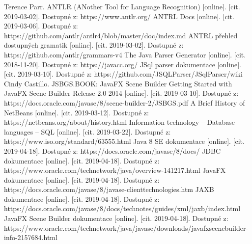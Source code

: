 \documentclass[czech,bachelor,public,dept460,male,cpdeclaration,twoside]{diploma}
\begin{document}
\begin{thebibliography}{99}
	 Terence Parr. ANTLR (ANother Tool for Language Recognition) [online]. [cit. 2019-03-02]. Dostupné z: https://www.antlr.org/
	 ANTRL Docs [online]. [cit. 2019-03-06]. Dostupné z: https://github.com/antlr/antlr4/blob/master/doc/index.md
	 ANTRL přehled dostupných gramatik [online]. [cit. 2019-03-02]. Dostupné z: https://github.com/antlr/grammars-v4
	 The Java Parser Generator [online]. [cit. 2018-11-20]. Dostupné z: https://javacc.org/
	 JSql parser dokumentace [online]. [cit. 2019-03-10]. Dostupné z: https://github.com/JSQLParser/JSqlParser/wiki
	 Cindy Castillo. JSBGS.BOOK: JavaFX Scene Builder Getting Started with JavaFX Scene Builder Release 2.0 2014 [online]. [cit. 2019-03-10]. Dostupné z: https://docs.oracle.com/javase/8/scene-builder-2/JSBGS.pdf
	 A Brief History of NetBeans [online]. [cit. 2019-03-12]. Dostupné z: https://netbeans.org/about/history.html
	 Information technology -- Database languages -- SQL [online]. [cit. 2019-03-22]. Dostupné z: https://www.iso.org/standard/63555.html
	 Java 8 SE dokumentace [online]. [cit. 2019-04-18]. Dostupné z: https://docs.oracle.com/javase/8/docs/
	 JDBC dokumentace [online]. [cit. 2019-04-18]. Dostupné z: https://www.oracle.com/technetwork/java/overview-141217.html
	 JavaFX dokumentace [online]. [cit. 2019-04-18]. Dostupné z: https://docs.oracle.com/javase/8/javase-clienttechnologies.htm
	 JAXB dokumentace [online]. [cit. 2019-04-18]. Dostupné z: https://docs.oracle.com/javase/8/docs/technotes/guides/xml/jaxb/index.html
	 JavaFX Scene Builder dokumentace [online]. [cit. 2019-04-18]. Dostupné z: https://www.oracle.com/technetwork/java/javase/downloads/javafxscenebuilder-info-2157684.html
	
	
	
	
	
	
	
	
	
	
	
	
	
	
\end{thebibliography}


\appendix %
\end{document}
